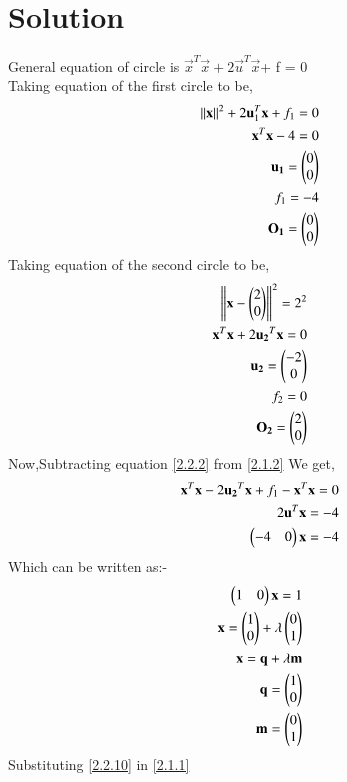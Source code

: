 \documentclass[journal,12pt,twocolumn]{IEEEtran}
\begin{document}
  \section{\textbf{Solution}}
General equation of circle is ${\vec{x}^T\vec{x}} + 2\vec{u}^T\vec{x} $+ f = 0\\
 Taking equation of the first circle to be,
 \begin{align}
 \left\lVert\mathbf{x}\right\rVert^2 + 2\mathbf{u}_1^T\mathbf{x} + f_1 = 0\label{2.1.1}\\
 {\mathbf{x}^{T}\mathbf{x}}-4=0 \label{2.1.2}\\
 \mathbf{u_1}=\begin{pmatrix}0\\0\end{pmatrix}\\
 f_1=-4\\
\mathbf{O_1}=\begin{pmatrix}0\\0\end{pmatrix}
 \end{align}
Taking equation of the second circle to be,
\begin{align}
  \left\lVert\mathbf{x}-\begin{pmatrix}2\\0\end{pmatrix}\right\rVert^2=2^2\\
  {\mathbf{x}^{T}\mathbf{x}+2\mathbf{u_2}^T\mathbf{x}}=0 \label{2.2.2}\\
  \mathbf{u_2}=\begin{pmatrix}-2\\0\end{pmatrix}\\
 f_2=0\\
 \mathbf{O_2}=\begin{pmatrix}2\\0\end{pmatrix}
  \end{align}
 Now,Subtracting equation \eqref{2.2.2} from \eqref{2.1.2} We get,
 \begin{align}
 \mathbf{x}^T\mathbf{x}-2\mathbf{u_2}^T\mathbf{x}+f_1-\mathbf{x}^{T}\mathbf{x}=0\\
 2\mathbf{u}^{T}\mathbf{x}=-4\\
 \begin{pmatrix}-4&0\end{pmatrix}\mathbf{x}=-4
 \end{align}
 Which can be written as:-
 \begin{align}
 \begin{pmatrix}1&0\end{pmatrix}\mathbf{x}=1\\
 \mathbf{x}=\begin{pmatrix}1 \\ 0\end{pmatrix} + \lambda \begin{pmatrix}0\\1\end{pmatrix}\\
\mathbf{x}=\mathbf{q}+\lambda\mathbf{m}\label{2.2.10}\\
\mathbf{q}=\begin{pmatrix}1 \\ 0\end{pmatrix} \\
\mathbf{m}=\begin{pmatrix}0\\1\end{pmatrix}
  \end{align}
 Substituting \eqref{2.2.10} in \eqref{2.1.1}
\end{document}
